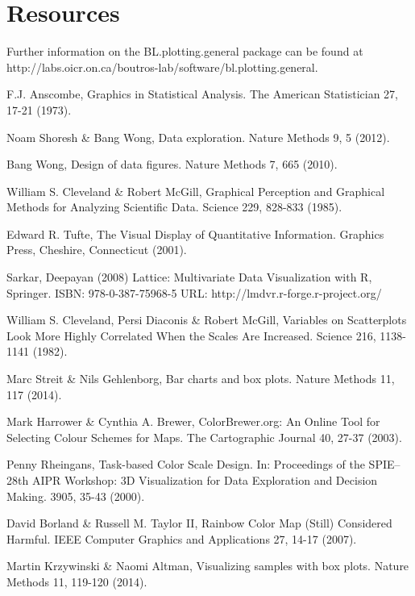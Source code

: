 \documentclass[letterpaper]{article}\usepackage[]{graphicx}\usepackage[]{color}
\begin{document}
\section{Resources}
Further information on the BL.plotting.general package can be found at  http://labs.oicr.on.ca/boutros-lab/software/bl.plotting.general.

\begin{thebibliography}{1}
F.J. Anscombe, Graphics in Statistical Analysis. The American Statistician 27, 17-21 (1973).

Noam Shoresh \& Bang Wong, Data exploration. Nature Methods 9, 5 (2012).

Bang Wong, Design of data figures. Nature Methods 7, 665 (2010).

William S. Cleveland \& Robert McGill, Graphical Perception and Graphical Methods for Analyzing Scientific Data. Science 229, 828-833 (1985).

Edward R. Tufte, The Visual Display of Quantitative Information. Graphics Press, Cheshire, Connecticut (2001).

Sarkar, Deepayan (2008) Lattice: Multivariate Data Visualization with R, Springer.  ISBN: 978-0-387-75968-5 URL: http://lmdvr.r-forge.r-project.org/

William S. Cleveland, Persi Diaconis \& Robert McGill, Variables on Scatterplots Look More Highly Correlated When the Scales Are Increased. Science 216, 1138-1141 (1982).

Marc Streit \& Nils Gehlenborg, Bar charts and box plots. Nature Methods 11, 117 (2014).

Mark Harrower \& Cynthia A. Brewer, ColorBrewer.org: An Online Tool for Selecting Colour Schemes for Maps. The Cartographic Journal 40, 27-37 (2003).

Penny Rheingans, Task-based Color Scale Design. In: Proceedings of the SPIE--28th AIPR Workshop: 3D Visualization for Data Exploration and Decision Making. 3905, 35-43 (2000).

David Borland \& Russell M. Taylor II, Rainbow Color Map (Still) Considered Harmful. IEEE Computer Graphics and Applications 27, 14-17 (2007).

Martin Krzywinski \& Naomi Altman, Visualizing samples with box plots. Nature Methods 11, 119-120 (2014).


\end{thebibliography}
\end{document}
